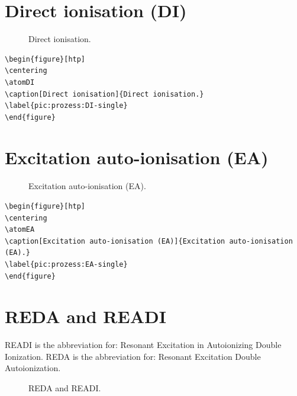 \documentclass[
	a4paper,
	parskip=half,
    pagesize=auto,      		%
    listof=totoc,   		%
    bibliography=totoc,
	11pt
]{scrartcl}
\begin{document}
\section{Direct ionisation (DI)}

\begin{figure}[htp]
\centering
\atomDI
\caption[Direct ionisation]{Direct ionisation.}
\label{pic:prozess:DI-single}
\end{figure}

\begin{lstlisting}
\begin{figure}[htp]
\centering
\atomDI
\caption[Direct ionisation]{Direct ionisation.}
\label{pic:prozess:DI-single}
\end{figure}
\end{lstlisting}






\section{Excitation auto-ionisation (EA)}

\begin{figure}[htp]
\centering
\atomEA
\caption[Excitation auto-ionisation (EA)]{Excitation auto-ionisation (EA).}
\label{pic:prozess:EA-single}
\end{figure}

\begin{lstlisting}
\begin{figure}[htp]
\centering
\atomEA
\caption[Excitation auto-ionisation (EA)]{Excitation auto-ionisation (EA).}
\label{pic:prozess:EA-single}
\end{figure}
\end{lstlisting}







\section{REDA and READI}

READI is the abbreviation for: Resonant Excitation in Autoionizing Double Ionization.
REDA is the abbreviation for: Resonant Excitation Double Autoionization.

\begin{figure}[htp]
\centering
\atomREDA[0.55][1.5]
\caption[REDA and READI]{REDA and READI.}
\label{pic:prozess:REDA-READI}
\end{figure}
\end{document}
